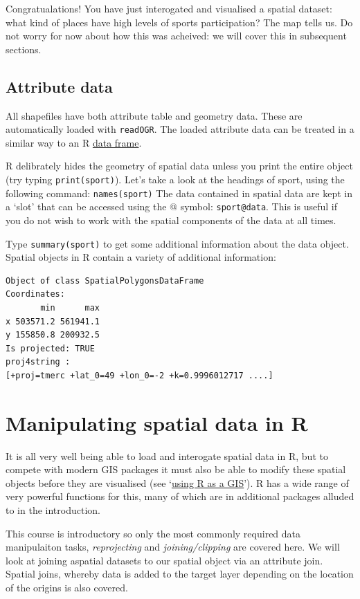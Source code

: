\documentclass[]{article}
\begin{document}
Congratualations! You have just interogated and visualised a spatial
dataset: what kind of places have high levels of sports participation?
The map tells us. Do not worry for now about how this was acheived: we
will cover this in subsequent sections.

\subsection{Attribute data}

All shapefiles have both attribute table and geometry data. These are
automatically loaded with \texttt{readOGR}. The loaded attribute data
can be treated in a similar way to an R
\href{http://www.statmethods.net/input/datatypes.html}{data frame}.

R delibrately hides the geometry of spatial data unless you print the
entire object (try typing \texttt{print(sport)}). Let's take a look at
the headings of sport, using the following command:
\texttt{names(sport)} The data contained in spatial data are kept in a
`slot' that can be accessed using the @ symbol: \texttt{sport@data}.
This is useful if you do not wish to work with the spatial components of
the data at all times.

Type \texttt{summary(sport)} to get some additional information about
the data object. Spatial objects in R contain a variety of additional
information:

\begin{verbatim}
Object of class SpatialPolygonsDataFrame
Coordinates:
       min      max
x 503571.2 561941.1
y 155850.8 200932.5
Is projected: TRUE 
proj4string :
[+proj=tmerc +lat_0=49 +lon_0=-2 +k=0.9996012717 ....]
\end{verbatim}
\section{Manipulating spatial data in R}

It is all very well being able to load and interogate spatial data in R,
but to compete with modern GIS packages it must also be able to modify
these spatial objects before they are visualised (see
`\href{https://github.com/Pakillo/R-GIS-tutorial}{using R as a GIS}'). R
has a wide range of very powerful functions for this, many of which are
in additional packages alluded to in the introduction.

This course is introductory so only the most commonly required data
manipulaiton tasks, \emph{reprojecting} and \emph{joining/clipping} are
covered here. We will look at joining aspatial datasets to our spatial
object via an attribute join. Spatial joins, whereby data is added to
the target layer depending on the location of the origins is also
covered.
\end{document}
